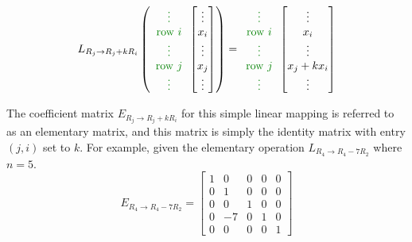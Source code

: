 \documentclass{article}
\newcommand{\dg}[1]{\textcolor{dark_green}{#1}}
\begin{document}
\[L_{R_j \rightarrow R_j + kR_i}\left(\dg{\begin{array}{c} \vdots \\ \text{row \(i\)} \\ \vdots \\ \text{row \(j\)} \\ \vdots \end{array}}\begin{bmatrix} \vdots \\ x_i \\ \vdots \\ x_j \\ \vdots \end{bmatrix}\right) = \dg{\begin{array}{c} \vdots \\ \text{row \(i\)} \\ \vdots \\ \text{row \(j\)} \\ \vdots \end{array}}\begin{bmatrix} \vdots \\ x_i \\ \vdots \\ x_j + k x_i \\ \vdots \end{bmatrix}\]

The coefficient matrix \(E_{R_j \rightarrow R_j + kR_i}\) for this simple linear mapping is referred to as an elementary matrix, and this matrix is simply the identity matrix with entry \((j, i)\) set to \(k\). For example, given the elementary operation \(L_{R_4 \rightarrow R_4 - 7R_2}\) where \(n = 5\). 
\[E_{R_4 \rightarrow R_4 - 7R_2} = \begin{bmatrix} 
1 & 0 & 0 & 0 & 0 \\
0 & 1 & 0 & 0 & 0 \\
0 & 0 & 1 & 0 & 0 \\
0 & -7 & 0 & 1 & 0 \\
0 & 0 & 0 & 0 & 1
\end{bmatrix}\]
\end{document}
